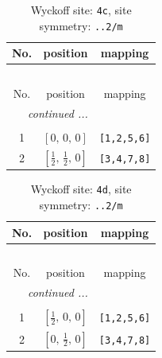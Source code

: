 \documentclass[fleqn,8pt]{jsarticle}
\begin{document}
\renewcommand{\arraystretch}{1.2}
\begin{longtable}{ccc}
\caption{Wyckoff site: {\tt 4c}, site symmetry: {\tt ..2/m}}
 \\
 \hline \hline
No. & position & mapping \\ \hline \endfirsthead

\multicolumn{2}{l}{\tablename\ \thetable{}} \\
 \hline \hline
No. & position & mapping \\ \hline \endhead

 \hline \hline
\multicolumn{2}{r}{\footnotesize\it continued ...} \\ \endfoot

 \hline \hline
\multicolumn{2}{r}{} \\ \endlastfoot

1 & $\left[ 0,\, 0,\, 0 \right]$ & {\tt [1,2,5,6]} \\ \hline
2 & $\left[ \frac{1}{2},\, \frac{1}{2},\, 0 \right]$ & {\tt [3,4,7,8]} \\
\end{longtable}
\renewcommand{\arraystretch}{1.2}
\begin{longtable}{ccc}
\caption{Wyckoff site: {\tt 4d}, site symmetry: {\tt ..2/m}}
 \\
 \hline \hline
No. & position & mapping \\ \hline \endfirsthead

\multicolumn{2}{l}{\tablename\ \thetable{}} \\
 \hline \hline
No. & position & mapping \\ \hline \endhead

 \hline \hline
\multicolumn{2}{r}{\footnotesize\it continued ...} \\ \endfoot

 \hline \hline
\multicolumn{2}{r}{} \\ \endlastfoot

1 & $\left[ \frac{1}{2},\, 0,\, 0 \right]$ & {\tt [1,2,5,6]} \\ \hline
2 & $\left[ 0,\, \frac{1}{2},\, 0 \right]$ & {\tt [3,4,7,8]} \\
\end{longtable}
\renewcommand{\arraystretch}{1.2}
\end{document}
